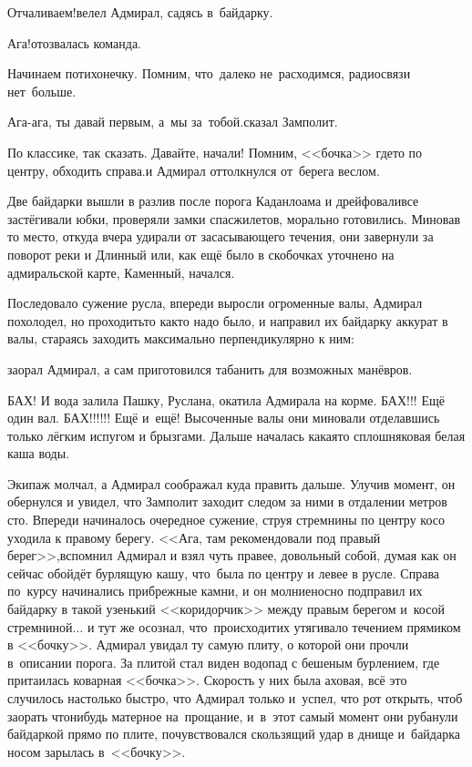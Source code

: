 \diagdash Отчаливаем!\mdash велел Адмирал, садясь в~байдарку.

\diagdash Ага!\mdash отозвалась команда.

\diagdash Начинаем потихонечку. Помним, что~далеко не~расходимся, радиосвязи нет~больше.

\diagdash Ага-ага, ты давай первым, а~мы за~тобой.\mdash сказал Замполит.

\diagdash По классике, так сказать. Давайте, начали! Помним, <<бочка>> где\sdash то по центру, обходить справа.\mdash и Адмирал оттолкнулся от~берега веслом.

Две байдарки вышли в разлив после порога Каданлоама и дрейфовали\mdash все застёгивали юбки, проверяли замки спасжилетов, морально готовились. Миновав то место, откуда вчера удирали от засасывающего течения, они завернули за поворот реки и Длинный или, как ещё было в скобочках уточнено на адмиральской карте, Каменный, начался.

Последовало сужение русла, впереди выросли огроменные валы, Адмирал похолодел, но проходить\sdash то как\sdash то надо было, и направил их байдарку аккурат в валы, стараясь заходить максимально перпендикулярно к ним:

\mdash заорал Адмирал, а сам приготовился табанить для возможных манёвров.

БАХ! И вода залила Пашку, Руслана, окатила Адмирала на корме. БАХ!!! Ещё один вал. БАХ!!!!!! Ещё и~ещё! Высоченные валы они миновали отделавшись только лёгким испугом и брызгами. Дальше началась какая\sdash то сплошняковая белая каша воды. 

Экипаж молчал, а Адмирал соображал куда править дальше. Улучив момент, он обернулся и увидел, что Замполит заходит следом за ними в отдалении метров сто. Впереди начиналось очередное сужение, струя стремнины по центру косо уходила к правому берегу. <<Ага, там рекомендовали под правый берег>>,\mdash вспомнил Адмирал и взял чуть правее, довольный собой, думая как он сейчас обойдёт бурлящую кашу, что~была по центру и левее в русле. Справа по~курсу начинались прибрежные камни, и он молниеносно подправил их байдарку в такой узенький <<коридорчик>> между правым берегом и~косой стремниной$\ldots$ и тут же осознал, что~происходит\mdash их утягивало течением прямиком в <<бочку>>. Адмирал увидал ту самую плиту, о которой они прочли в~описании порога. За плитой стал виден водопад с бешеным бурлением, где притаилась коварная <<бочка>>. Скорость у них была аховая, всё это случилось настолько быстро, что Адмирал только и~успел, что рот открыть, чтоб заорать что\sdash нибудь матерное на~прощание, и~в~этот самый момент они рубанули байдаркой прямо по плите, почувствовался скользящий удар в днище и~байдарка носом зарылась в~<<бочку>>.

